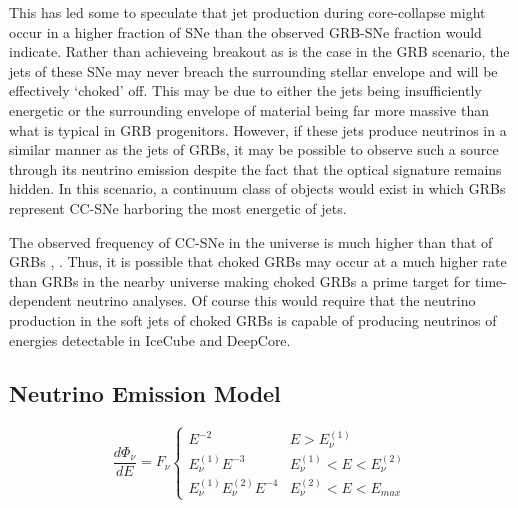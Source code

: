 \documentclass{gatech-thesis}
\begin{document}
This has led some to speculate that jet production during core-collapse might occur in a higher fraction of SNe than the observed GRB-SNe fraction would indicate. Rather than achieveing breakout as is the case in the GRB scenario, the jets of these SNe may never breach the surrounding stellar envelope and will be effectively `choked' off. This may be due to either the jets being insufficiently energetic or the surrounding envelope of material being far more massive than what is typical in GRB progenitors. However, if these jets produce neutrinos in a similar manner as the jets of GRBs, it may be possible to observe such a source through its neutrino emission despite the fact that the optical signature remains hidden. In this scenario, a continuum class of objects would exist in which GRBs represent CC-SNe harboring the most energetic of jets.

The observed frequency of CC-SNe in the universe is much higher than that of GRBs \cite{0004-637X-738-2-154}, \cite{2004RvMP...76.1143P}. Thus, it is possible that choked GRBs may occur at a much higher rate than GRBs in the nearby universe making choked GRBs a prime target for time-dependent neutrino analyses. Of course this would require that the neutrino production in the soft jets of choked GRBs is capable of producing neutrinos of energies detectable in IceCube and DeepCore.

\subsection{Neutrino Emission Model}

\begin{equation}
\frac{d\Phi_\nu}{dE}=F_\nu\left\{\begin{array}{cc}
E^{-2} & E > E_{\nu}^{(1)} \\ 
E_{\nu}^{(1)}E^{-3} & E_{\nu}^{(1)}< E < E_{\nu}^{(2)} \\ 
E_{\nu}^{(1)}E_{\nu}^{(2)}E^{-4} & E_{\nu}^{(2)}< E < E_{max}
\end{array}\right.
\end{equation}


\end{document}

